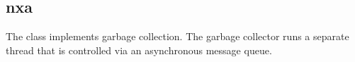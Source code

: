 %
%
%
%
%              

\subsection{nxa}
\label{nxa}

The  class implements garbage collection.  The garbage collector
runs a separate thread that is controlled via an asynchronous message queue.

